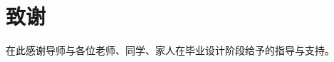 \documentclass[12pt,openany,oneside]{ctexbook}
\begin{document}
\chapter*{\xiaoer\hei\textbf{致\qquad\qquad 谢}}
\Revisexiaosi\song
在此感谢导师与各位老师、同学、家人在毕业设计阶段给予的指导与支持。


\clearpage
\end{document}
